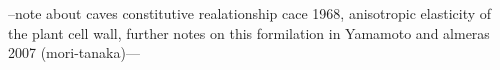 --note about caves constitutive realationship cace 1968, anisotropic
elasticity of the plant cell wall, further notes on this formilation in Yamamoto
and almeras 2007 (mori-tanaka)---